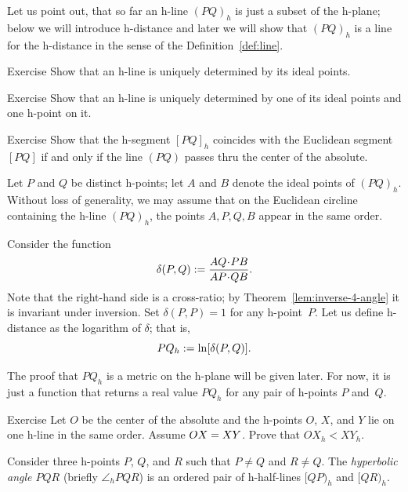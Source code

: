 Let us point out, that so far an h-line $(PQ)_h$ is just a subset of the h-plane;
below we will introduce h-distance 
and later we will show that $(PQ)_h$ is a line for the h-distance in the sense of the Definition~\ref{def:line}. 

\begin{thm}{Exercise}\label{ex:ideal-line-unique}
Show that an h-line is uniquely determined by its ideal points.
\end{thm}

\begin{thm}{Exercise}\label{ex:1ideal-line-unique}
Show that an h-line is uniquely determined by one of its ideal points and one h-point on it.
\end{thm}

\begin{thm}{Exercise}\label{ex:line/h-line}
Show that the h-segment $[PQ]_h$ coincides with the Euclidean segment $[PQ]$
if and only if the line $(PQ)$ passes thru the center of the absolute.
\end{thm}

\label{h-dist}
Let $P$ and $Q$ be distinct h-points;
let $A$ and $B$ denote the ideal points of $(PQ)_h$.
Without loss of generality, we may assume that on the Euclidean circline containing the h-line $(PQ)_h$, the points $A,P,Q,B$ appear in the same order.

Consider the function 
$$\delta(P,Q)\df\frac{AQ\cdot PB}{AP\cdot QB}.$$
Note that the right-hand side is a cross-ratio;
by Theorem~\ref{lem:inverse-4-angle} it is invariant under inversion.
Set $\delta(P,P)=1$ for any h-point~$P$.
Let us define h-distance as the logarithm of $\delta$; that is,
$$PQ_h:=\ln[\delta(P,Q)].$$

The proof that $PQ_h$ is a metric on the h-plane will be given later.
For now, it is just a function that returns a real value $PQ_h$ for any pair of h-points $P$ and~$Q$.

\begin{thm}{Exercise}\label{ex:h-dist-eq}
Let $O$ be the center of the absolute and the h-points $O$, $X$, and $Y$ lie on one h-line in the same order.
Assume $OX\z=XY$.
Prove that $OX_h<XY_h$.
\end{thm}


\label{h-angle measure}
Consider three h-points $P$, $Q$, and $R$
such that $P\ne Q$ and $R\ne Q$.
The \emph{hyperbolic angle $PQR$} (briefly $\angle_h PQR$) is an ordered pair of h-half-lines $[QP)_h$ and $[QR)_h$.

